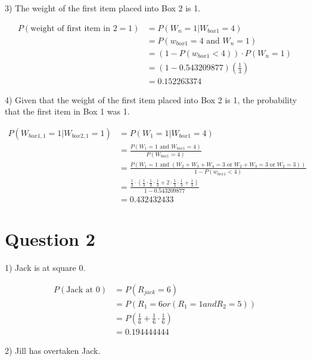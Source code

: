 \documentclass[11pt]{article}
\begin{document}
3) The weight of the first item placed into Box 2 is 1.

\begin{align*}
P(\text{weight of first item in 2} = 1) &= P(W_n = 1 | W_{box1} = 4)\\
                                        &= P(w_{box1} = 4 \text{ and } W_n = 1)\\
                                        &= (1 - P(w_{box1} < 4)) \cdot P(W_n = 1)\\
                                        &= (1 - 0.543209877)(\frac13)\\
                                        &= 0.152263374
\end{align*}

4) Given that the weight of the first item placed into Box 2 is 1, the probability that the first item in Box 1 was 1.

\begin{align*}
P(W_{box1,1} = 1 | W_{box2,1} = 1) &= P(W_1 = 1 | W_{box1} = 4)\\
                                   &= \frac{P(W_1 = 1 \text{ and } W_{box1} = 4)}{P(W_{box1} = 4)}\\
                                   &= \frac{P(W_1 = 1 \text{ and } (W_2 + W_3 + W_4 = 3 \text{ or } W_2 + W_3 = 3 \text{ or } W_2 = 3))}{1 - P(w_{box1} < 4)}\\
                                   &= \frac{\frac13 \cdot (\frac13 \cdot \frac13 \cdot \frac13 + 2 \cdot \frac13 \cdot \frac13 + \frac13)}{1 - 0.543209877}\\
                                   &= 0.432432433
\end{align*}

\section{Question 2}

1) Jack is at square 0.

\begin{align*}
P(\text{Jack at 0}) &= P(R_{jack} = 6)\\
                    &= P(R_1 = 6 or (R_1 = 1 and R_2 = 5))\\
                    &= P(\frac16 + \frac16 \cdot \frac16)\\
                    &= 0.194444444
\end{align*}

2) Jill has overtaken Jack.
\end{document}
